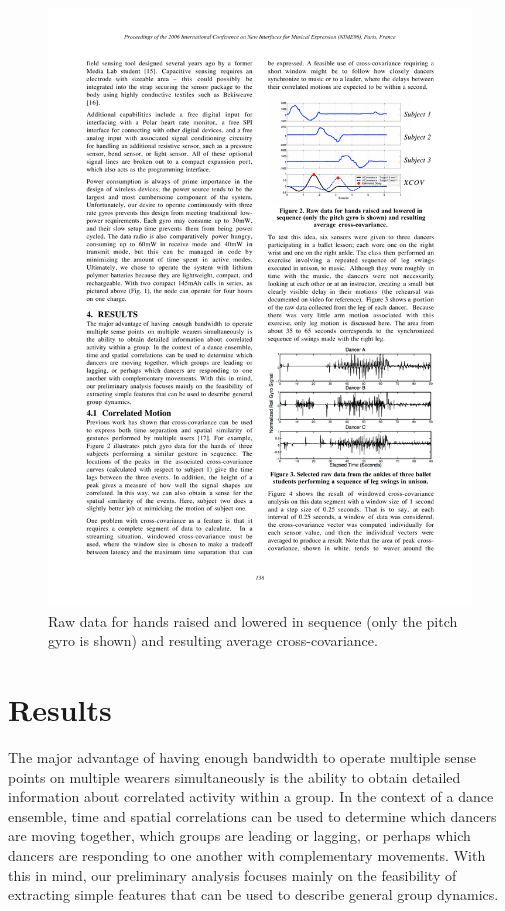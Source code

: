 \begin{figure}[t]
\centering
\includegraphics[width=\textwidth]{jp_fig2} 
\caption{Raw data for hands raised and lowered in sequence (only the pitch gyro is shown) and resulting average cross-covariance.}
\label{Aylward:fig:2} 
\end{figure}

\section{Results}


The major advantage of having enough bandwidth to operate multiple sense points
on multiple wearers simultaneously is the ability to obtain detailed information
about correlated activity within a group. In the context of a dance ensemble,
time and spatial correlations can be used to determine which dancers are moving
together, which groups are leading or lagging, or perhaps which dancers are
responding to one another with complementary movements. With this in mind, our
preliminary analysis focuses mainly on the feasibility of extracting simple
features that can be used to describe general group dynamics.

